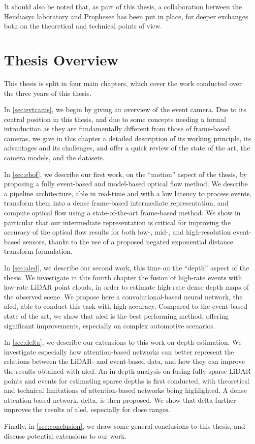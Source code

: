 It should also be noted that, as part of this thesis, a collaboration between the Heudiasyc laboratory and Prophesee has been put in place, for deeper exchanges both on the theoretical and technical points of view.


\section{Thesis Overview}
This thesis is split in four main chapters, which cover the work conducted over the three years of this thesis.

In \cref{sec:evtcams}, we begin by giving an overview of the event camera. Due to its central position in this thesis, and due to some concepts needing a formal introduction as they are fundamentally different from those of frame-based cameras, we give in this chapter a detailed description of its working principle, its advantages and its challenges, and offer a quick review of the state of the art, the camera models, and the datasets.

In \cref{sec:ebof}, we describe our first work, on the ``motion'' aspect of the thesis, by proposing a fully event-based and model-based optical flow method. We describe a pipeline architecture, able in real-time and with a low latency to process events, transform them into a dense frame-based intermediate representation, and compute optical flow using a state-of-the-art frame-based method. We show in particular that our intermediate representation is critical for improving the accuracy of the optical flow results for both low-, mid-, and high-resolution event-based sensors, thanks to the use of a proposed negated exponential distance transform formulation.

In \cref{sec:aled}, we describe our second work, this time on the ``depth'' aspect of the thesis. We investigate in this fourth chapter the fusion of high-rate events with low-rate LiDAR point clouds, in order to estimate high-rate dense depth maps of the observed scene. We propose here a convolutional-based neural network, the \acrfull{aled}, able to conduct this task with high accuracy. Compared to the event-based state of the art, we show that \acrshort{aled} is the best performing method, offering significant improvements, especially on complex automotive scenarios.

In \cref{sec:delta}, we describe our extensions to this work on depth estimation. We investigate especially how attention-based networks can better represent the relations between the LiDAR- and event-based data, and how they can improve the results obtained with \acrshort{aled}. An in-depth analysis on fusing fully sparse LiDAR points and events for estimating sparse depths is first conducted, with theoretical and technical limitations of attention-based networks being highlighted. A dense attention-based network, \acrshort{delta}, is then proposed. We show that \acrshort{delta} further improves the results of \acrshort{aled}, especially for close ranges.

Finally, in \cref{sec:conclusion}, we draw some general conclusions to this thesis, and discuss potential extensions to our work.
